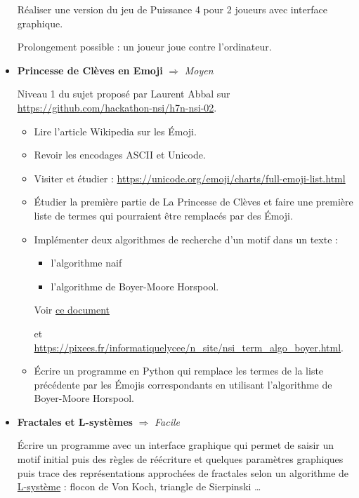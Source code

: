 \documentclass[a4paper, french, 12pt]{article}  %
\newcounter{act}
\newcounter{thme}
\newcounter{prop}
\newcounter{alg}
\begin{document}
\begin{itemize}
\medskip

Réaliser une version du jeu de Puissance 4 pour 2 joueurs avec interface graphique.


Prolongement possible : un joueur joue contre l'ordinateur.  


\bigskip 


\item \textbf{Princesse de Clèves en Emoji}  $\Rightarrow$ \textit{Moyen}

Niveau 1 du sujet proposé par Laurent Abbal sur \url{https://github.com/hackathon-nsi/h7n-nsi-02}.

\begin{itemize}
\item     Lire l'article Wikipedia sur les Émoji.
 \item   Revoir les encodages ASCII et Unicode.
  \item   Visiter et étudier : \url{https://unicode.org/emoji/charts/full-emoji-list.html}
   \item  Étudier la première partie de La Princesse de Clèves et faire une première liste de termes qui pourraient être remplacés par des Émoji.
   \item Implémenter deux algorithmes de recherche d'un motif dans un texte :
   	\begin{itemize}
   		\item l'algorithme naif
   		\item l'algorithme de Boyer-Moore Horspool.  
\end{itemize}   	 
Voir \href{https://cache.media.eduscol.education.fr/file/NSI/63/5/RA20_NSI_G_T_boyer-moore_1298635.pdf}{ce document}

et \url{https://pixees.fr/informatiquelycee/n_site/nsi_term_algo_boyer.html}.
   \item  Écrire un programme en Python qui remplace les termes de la liste précédente par les Émojis correspondants en utilisant l'algorithme de Boyer-Moore Horspool.
  \end{itemize}



\bigskip

\item \textbf{Fractales et L-systèmes} $\Rightarrow$ \textit{Facile}

Écrire un programme avec un interface graphique qui permet de saisir un motif initial puis des règles de réécriture et quelques paramètres graphiques puis  trace des représentations approchées de fractales selon un algorithme de \href{https://fr.wikipedia.org/wiki/L-Syst\%C3\%A8me}{L-système} : flocon de Von Koch, triangle de Sierpinski \ldots 


\end{itemize}
\end{document}
